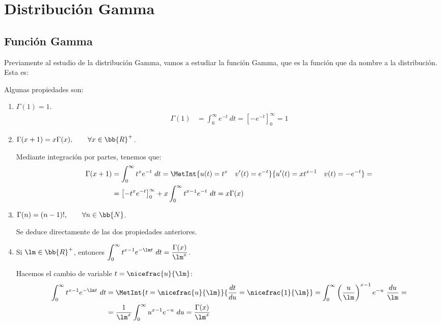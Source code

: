 \section{Distribución Gamma}

\subsection{Función Gamma}
Previamente al estudio de la distribución Gamma, vamos a estudiar la función Gamma, que es la función que da nombre a la distribución.
Esta es:

Algunas propiedades son:
\begin{enumerate}
    \item $\Gamma(1) = 1$. \label{prop:gamma1}
    \begin{align*}
        \Gamma(1) &= \int_{0}^{\infty} e^{-t}~dt = \left[ -e^{-t} \right]_{0}^{\infty} = 1
    \end{align*}

    \item $\Gamma(x+1) = x\Gamma(x),\qquad \forall x\in \bb{R}^+$. \label{prop:gamma2}
    
    Mediante integración por partes, tenemos que:
    \begin{align*}
        \Gamma(x+1) &= \int_{0}^{\infty} t^{x}e^{-t}~dt
        = \MetInt{u(t) = t^x \quad v'(t) = e^{-t}}{u'(t) = xt^{x-1} \quad v(t) = -e^{-t}}
        =\\&= \left[ -t^xe^{-t} \right]_{0}^{\infty} + x\int_{0}^{\infty} t^{x-1}e^{-t}~dt
        = x\Gamma(x)
    \end{align*}

    \item $\Gamma(n) = (n-1)!,\qquad \forall n\in \bb{N}$. \label{prop:gamma3}
    
    Se deduce directamente de las dos propiedades anteriores.

    \item \label{prop:gamma4}
    Si $\lm\in \bb{R}^+$, entonces $\displaystyle \int_{0}^{\infty} t^{x-1}e^{-\lm t}~dt = \dfrac{\Gamma(x)}{\lm^x}$.
    
    Hacemos el cambio de variable $t = \nicefrac{u}{\lm}$:
    \begin{align*}
        \int_{0}^{\infty} t^{x-1}e^{-\lm t}~dt
        &= \MetInt{t=\nicefrac{u}{\lm}}{\frac{dt}{du} = \nicefrac{1}{\lm}}
        = \int_{0}^{\infty} \left( \dfrac{u}{\lm} \right)^{x-1}e^{-u}~\dfrac{du}{\lm}
        =\\&= \dfrac{1}{\lm^x} \int_{0}^{\infty} u^{x-1}e^{-u}~du
        = \dfrac{\Gamma(x)}{\lm^x}
    \end{align*}


\end{enumerate}
